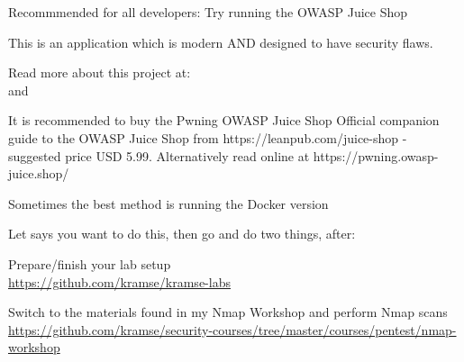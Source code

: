 \documentclass[Screen16to9,17pt]{foils}
\begin{document}
\begin{list1}
\item Recommmended for all developers: Try running the OWASP Juice Shop
\item This is an application which is modern AND designed to have security flaws.
\item Read more about this project at:\\
 and\\ 
\item It is recommended to buy the Pwning OWASP Juice Shop Official companion guide to the OWASP Juice Shop from https://leanpub.com/juice-shop - suggested price USD 5.99. Alternatively read online at https://pwning.owasp-juice.shop/
\item Sometimes the best method is running the Docker version
\end{list1}



\begin{list2}
\item Let says you want to do this, then go and do two things, after:
\item Prepare/finish your lab setup\\
\url{https://github.com/kramse/kramse-labs}

\item Switch to the materials found in my Nmap Workshop and perform Nmap scans\\
\url{https://github.com/kramse/security-courses/tree/master/courses/pentest/nmap-workshop}
\end{list2}
\end{document}
